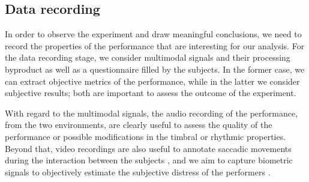 \subsection{Data recording}
In order to observe the experiment and draw meaningful conclusions, we need to record the properties of the performance that are interesting for our analysis. For the data recording stage, we consider multimodal signals and their processing byproduct as well as a questionnaire filled by the subjects. In the former case, we can extract objective metrics of the performance, while in the latter we consider subjective results; both are important to assess the outcome of the experiment. 

With regard to the multimodal signals, the audio recording of the performance, from the two environments, are clearly useful to assess the quality of the performance or possible modifications in the timbral or rhythmic properties. Beyond that, video recordings are also useful to annotate saccadic movements during the interaction between the subjects \cite{vandemoortele2018gazing}, and we aim to capture biometric signals to objectively estimate the subjective distress of the performers \cite{Yoshie2009}. 
